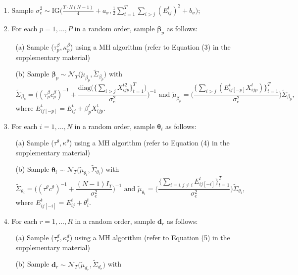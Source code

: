 \documentclass[a4paper]{article}
\begin{document}
	\begin{itemize}
		\item [1.] Sample $\sigma_e^2 \sim \mbox{IG}\big(\frac{T\cdot N(N-1)}{4}+a_\sigma, \frac{1}{2}\sum\limits_{t=1}^T\sum\limits_{i> j}(E^t_{ij})^2 + b_\sigma\big)$;
		\item [2.] For each $p = 1,\ldots,P$ in a random order, sample $\boldsymbol{\beta}_{p}$ as follows:
		\begin{enumerate} 
			\item [(a)] Sample ($\tau^{\beta}_p ,\kappa^\beta_p$) using a MH algorithm (refer to Equation (3) in the supplementary material)
			\item [(b)] Sample $\boldsymbol{\beta}_{p} \sim \mathcal{N}_T\big(\tilde{\mu}_{\beta_p}, \tilde{\Sigma}_{\beta_p} \big)$ with 
			$$\tilde{\Sigma}_{\beta_p} = \Big((\tau^{\beta}_pc^\beta_p)^{-1}+\frac{\mbox{diag}\big(\{\sum_{i>j}{X^{t2}_{ijp}}\}_{t=1}^{T}\big)}{\sigma_e^2}\Big)^{-1} \mbox{ and } \tilde{\mu}_{\beta_p} =  \Big(\frac{\{\sum_{i>j}(E^{t}_{ij[-p]}X^t_{ijp})\}_{t=1}^{T}}{\sigma_e^2}\Big)\tilde{\Sigma}_{\beta_p},$$ 
			where $E^{t}_{ij[-p]}=E^t_{ij}+\beta^t_{p}X^{t}_{ijp}$.						
		\end{enumerate}
		\item [3.] For each $i= 1,\ldots,N$ in a random order, sample $\boldsymbol{\theta}_{i}$ as follows:
		\begin{enumerate}
			\item [(a)] Sample ($\tau^{\theta},  \kappa^\theta$) using a MH algorithm (refer to Equation (4) in the supplementary material)
			\item [(b)] Sample $\boldsymbol{\theta}_{i} \sim \mathcal{N}_T\big(\tilde{\mu}_{\theta_i}, \tilde{\Sigma}_{\theta_i} \big)$ with
			$$\tilde{\Sigma}_{\theta_i} = \Big((\tau^\theta c^\theta)^{-1}+\frac{(N-1)I_T}{\sigma_e^2}\Big)^{-1} \mbox{ and }
			\tilde{\mu}_{\theta_i} = \Big(\frac{\{\sum_{i=i, j\neq i}E^{t}_{ij[-i]}\}_{t=1}^{T}}{\sigma_e^2}\Big)\tilde{\Sigma}_{\theta_i},$$ where $E^{t}_{ij[-i]}=E^t_{ij}+\theta^t_{i}.$
		\end{enumerate}
		\item [4.] For each $r =1,\ldots,R$ in a random order, sample $\boldsymbol{d}_{r}$ as follows:
		\begin{enumerate}
			\item [(a)] Sample  ($\tau_r^{d},  \kappa_r^d$) using a MH algorithm (refer to Equation (5) in the supplementary material)
			\item [(b)] Sample $\boldsymbol{d}_{r} \sim \mathcal{N}_T\big(\tilde{\mu}_{d_r}, \tilde{\Sigma}_{d_r} \big)$ with

\end{enumerate}
\end{itemize}
\end{document}
